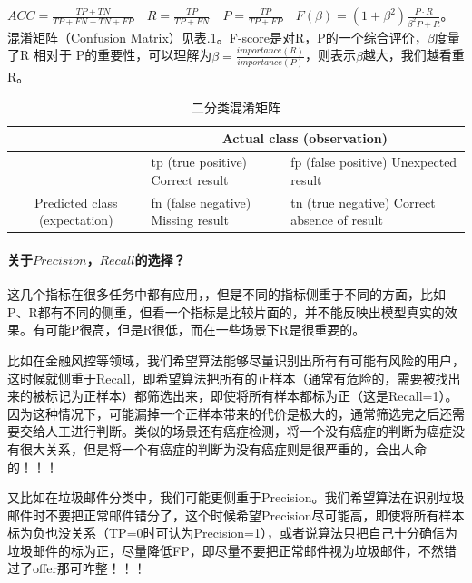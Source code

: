 $ACC = \frac{TP + TN}{TP+FN+TN+FP}\quad R = \frac{TP}{TP+FN}\quad P = \frac{TP}{TP+FP}\quad F(\beta) = (1 + \beta^2)\frac{P \cdot R}{\beta^2 P + R}$。混淆矩阵（Confusion Matrix）见表.\ref{tab:confusion_mat}。F-score是对R，P的一个综合评价，$\beta$度量了R 相对于 P的重要性，可以理解为$\beta = \frac{importance(R) }{importance(P)}$，则表示$\beta$越大，我们越看重R。

\begin{table}[h]
	\centering
	\caption{二分类混淆矩阵}
	\label{tab:confusion_mat}
	\begin{tabular}{|c|l|l|}
		\hline
		\multicolumn{1}{|l|}{}                          & \multicolumn{2}{c|}{Actual class (observation)}                                                                                   \\ \hline
		& tp (true positive) Correct result                          & fp (false positive) Unexpected result                                \\ \cline{2-3} 
		\multirow{-2}{*}{Predicted class (expectation)} & \cellcolor[HTML]{68CBD0}fn (false negative) Missing result & \cellcolor[HTML]{68CBD0}tn (true negative) Correct absence of result \\ \hline
	\end{tabular}
\end{table}

\paragraph*{关于$Precision$，$Recall$的选择？}这几个指标在很多任务中都有应用，，但是不同的指标侧重于不同的方面，比如P、R都有不同的侧重，但看一个指标是比较片面的，并不能反映出模型真实的效果。有可能P很高，但是R很低，而在一些场景下R是很重要的。

比如在金融风控等领域，我们希望算法能够尽量识别出所有有可能有风险的用户，这时候就侧重于Recall，即希望算法把所有的正样本（通常有危险的，需要被找出来的被标记为正样本）都筛选出来，即使将所有样本都标为正（这是Recall=1）。因为这种情况下，可能漏掉一个正样本带来的代价是极大的，通常筛选完之后还需要交给人工进行判断。类似的场景还有癌症检测，将一个没有癌症的判断为癌症没有很大关系，但是将一个有癌症的判断为没有癌症则是很严重的，会出人命的！！！

又比如在垃圾邮件分类中，我们可能更侧重于Precision。我们希望算法在识别垃圾邮件时不要把正常邮件错分了，这个时候希望Precision尽可能高，即使将所有样本标为负也没关系（TP=0时可认为Precision=1），或者说算法只把自己十分确信为垃圾邮件的标为正，尽量降低FP，即尽量不要把正常邮件视为垃圾邮件，不然错过了offer那可咋整！！！

